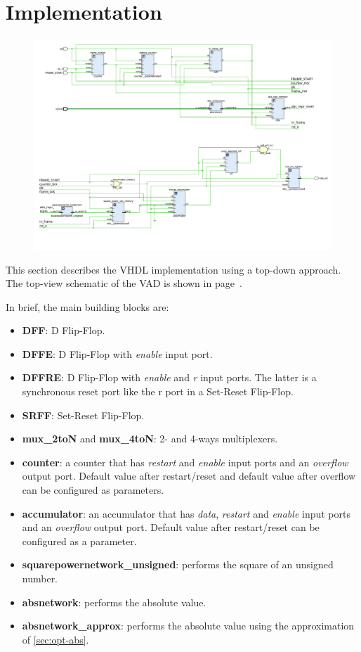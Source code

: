 \section{Implementation}

\begin{figure}
  \vspace*{-3.5cm}
  \hspace*{-3cm}
  \centering
  \includegraphics[width=29cm, angle=90]{figs/vad_rtl_schematic_split.pdf}
  \label{fig:schematic_rtl}
\end{figure}

This section describes the VHDL implementation using a top-down approach. The 
top-view schematic of the VAD is shown in page~\pageref{fig:schematic_rtl}.

In brief, the main building blocks are:
\begin{itemize}
  \item \textbf{DFF}: D Flip-Flop.
  \item \textbf{DFFE}: D Flip-Flop with \emph{enable} input port.
  \item \textbf{DFFRE}: D Flip-Flop with \emph{enable} and \emph{r} input ports.
    The latter is a synchronous reset port like the r port in a Set-Reset Flip-Flop.
  \item \textbf{SRFF}: Set-Reset Flip-Flop.
  \item \textbf{mux\_2toN} and \textbf{mux\_4toN}: 2- and 4-ways multiplexers.
  \item \textbf{counter}: a counter that has \emph{restart} and \emph{enable}
    input ports and an \emph{overflow} output port. Default value after restart/reset
    and default value after overflow can be configured as parameters.
  \item \textbf{accumulator}: an accumulator that has \emph{data}, \emph{restart} and \emph{enable}
    input ports and an \emph{overflow} output port. Default value after restart/reset 
    can be configured as a parameter.
  \item \textbf{squarepowernetwork\_unsigned}: performs the square of an unsigned 
    number.
  \item \textbf{absnetwork}: performs the absolute value.
  \item \textbf{absnetwork\_approx}: performs the absolute value using the approximation
    of \cref{sec:opt-abs}.
\end{itemize}

